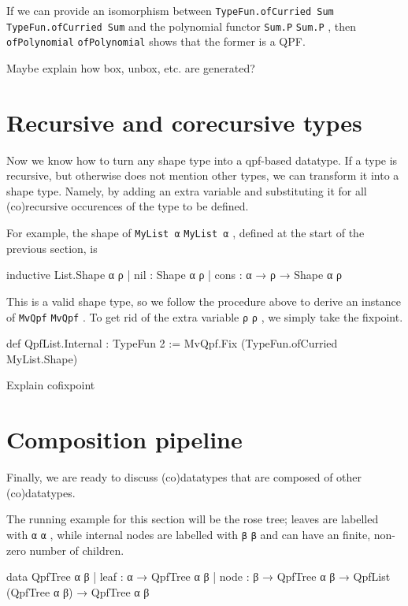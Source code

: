 \documentclass[titlepage]{report}
\newenvironment{todo}{%
\definecolor{shadecolor}{HTML}{F8E0E0}%
\begin{shaded}%
\begin{trivlist}                         
    \item[\hskip \labelsep {\bfseries Todo:}]}{\end{trivlist}\end{shaded}}
\newcommand\lean[1]{%
\ifx\leanmode\undefined%
\def\leanmode{1}%
\texttt{\small #1}%
\undef\leanmode%
\else%
\texttt{#1}%
\fi%
}
\begin{document}
If we can provide an isomorphism between \lean{TypeFun.ofCurried Sum} and the polynomial functor \lean{Sum.P}, 
then \lean{ofPolynomial} shows that the former is a QPF.

\begin{todo}
    Maybe explain how box, unbox, etc. are generated?
\end{todo}






\section{Recursive and corecursive types}
Now we know how to turn any shape type into a qpf-based datatype.
If a type is recursive, but otherwise does not mention other types, we can transform it into a shape
type.
Namely, by adding an extra variable and substituting it for all (co)recursive occurences of the type
to be defined.

For example, the shape of \lean{MyList α}, defined at the start of the previous section, is
\begin{leancode}
    inductive List.Shape α ρ
      | nil  : Shape α ρ
      | cons : α → ρ → Shape α ρ
\end{leancode}
This is a valid shape type, so we follow the procedure above to derive an instance of \lean{MvQpf}.
To get rid of the extra variable \lean{ρ}, we simply take the fixpoint.
\begin{leancode}
    def QpfList.Internal : TypeFun 2 
        := MvQpf.Fix (TypeFun.ofCurried MyList.Shape)

\end{leancode}

\begin{todo}
    Explain cofixpoint
\end{todo}



\section{Composition pipeline}
Finally, we are ready to discuss (co)datatypes that are composed of other (co)datatypes.

The running example for this section will be the rose tree; leaves are labelled with \lean{α}, while
internal nodes are labelled with \lean{β} and can have an finite, non-zero number of children.
\begin{leancode}
    data QpfTree α β
      | leaf : α → QpfTree α β
      | node : β → QpfTree α β → QpfList (QpfTree α β) → QpfTree α β
\end{leancode}
\end{document}
